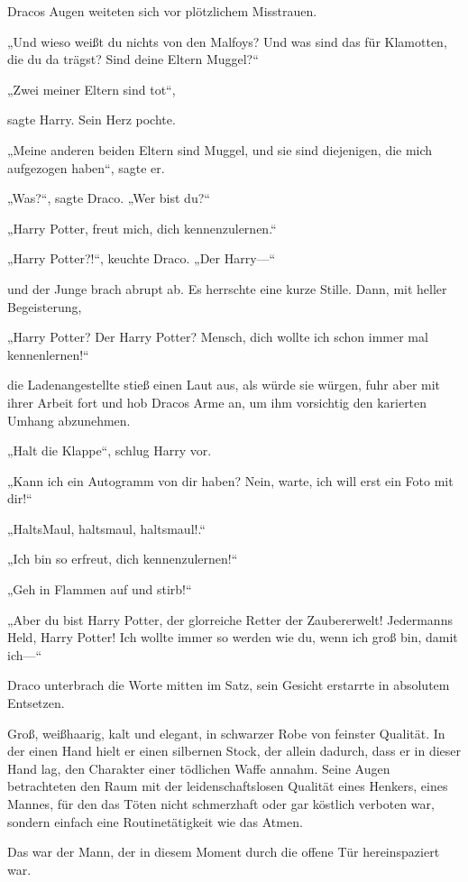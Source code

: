 {Dracos Augen weiteten sich vor plötzlichem Misstrauen.

„Und wieso weißt du nichts von den Malfoys? Und was sind das für Klamotten, die du da trägst? Sind deine Eltern Muggel?“

„Zwei meiner Eltern sind tot“,

sagte Harry. Sein Herz pochte.

„Meine anderen beiden Eltern sind Muggel, und sie sind diejenigen, die mich aufgezogen haben“, sagte er.

„Was?“, sagte Draco. „Wer bist du?“

„Harry Potter, freut mich, dich kennenzulernen.“

„Harry Potter?!“, keuchte Draco. „Der Harry—“

und der Junge brach abrupt ab. Es herrschte eine kurze Stille. Dann, mit heller Begeisterung,

„Harry Potter? Der Harry Potter? Mensch, dich wollte ich schon immer mal kennenlernen!“

die Ladenangestellte stieß einen Laut aus, als würde sie würgen, fuhr aber mit ihrer Arbeit fort und hob Dracos Arme an, um ihm vorsichtig den karierten Umhang abzunehmen.

„Halt die Klappe“, schlug Harry vor.

„Kann ich ein Autogramm von dir haben? Nein, warte, ich will erst ein Foto mit dir!“

„HaltsMaul, haltsmaul, haltsmaul!.“

„Ich bin so erfreut, dich kennenzulernen!“

„Geh in Flammen auf und stirb!“

„Aber du bist Harry Potter, der glorreiche Retter der Zaubererwelt! Jedermanns Held, Harry Potter! Ich wollte immer so werden wie du, wenn ich groß bin, damit ich—“

Draco unterbrach die Worte mitten im Satz, sein Gesicht erstarrte in absolutem Entsetzen.

Groß, weißhaarig, kalt und elegant, in schwarzer Robe von feinster Qualität. In der einen Hand hielt er einen silbernen Stock, der allein dadurch, dass er in dieser Hand lag, den Charakter einer tödlichen Waffe annahm. Seine Augen betrachteten den Raum mit der leidenschaftslosen Qualität eines Henkers, eines Mannes, für den das Töten nicht schmerzhaft oder gar köstlich verboten war, sondern einfach eine Routinetätigkeit wie das Atmen.

Das war der Mann, der in diesem Moment durch die offene Tür hereinspaziert war.

}
